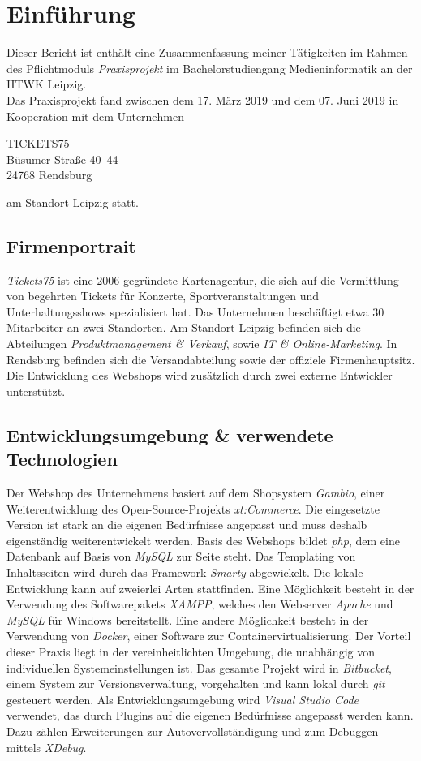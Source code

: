 \chapter{Einführung}\label{ch:einführung}
Dieser Bericht ist enthält eine Zusammenfassung meiner Tätigkeiten im Rahmen des Pflichtmoduls \textit{Praxisprojekt} im Bachelorstudiengang Medieninformatik an der HTWK Leipzig.\\
Das Praxisprojekt fand zwischen dem 17. März 2019 und dem 07. Juni 2019 in Kooperation mit dem Unternehmen
\begin{center}
	TICKETS75\\
	Büsumer Straße 40–44\\
	24768 Rendsburg
\end{center}
am Standort Leipzig statt.

\section{Firmenportrait}
\textit{Tickets75} ist eine 2006 gegründete Kartenagentur, die sich auf die Vermittlung von begehrten Tickets für Konzerte, Sportveranstaltungen und Unterhaltungsshows spezialisiert hat.
Das Unternehmen beschäftigt etwa 30 Mitarbeiter an zwei Standorten. Am Standort Leipzig befinden sich die Abteilungen \textit{Produktmanagement \& Verkauf}, sowie \textit{IT \& Online-Marketing}. 
In Rendsburg befinden sich die Versandabteilung sowie der offiziele Firmenhauptsitz. Die Entwicklung des Webshops wird zusätzlich durch zwei externe Entwickler
unterstützt.

\section{Entwicklungsumgebung \& verwendete Technologien}
Der Webshop des Unternehmens basiert auf dem Shopsystem \textit{Gambio}, einer Weiterentwicklung des Open-Source-Projekts \textit{xt:Commerce}. 
Die eingesetzte Version ist stark an die eigenen Bedürfnisse angepasst und muss deshalb eigenständig weiterentwickelt werden. Basis des Webshops bildet \textit{php}, 
dem eine Datenbank auf Basis von \textit{MySQL} zur Seite steht. Das Templating von Inhaltsseiten wird durch das Framework \textit{Smarty} abgewickelt. 
Die lokale Entwicklung kann auf zweierlei Arten stattfinden. Eine Möglichkeit besteht in der Verwendung des Softwarepakets \textit{XAMPP}, 
welches den Webserver \textit{Apache} und \textit{MySQL} für Windows bereitstellt. Eine andere Möglichkeit besteht in der Verwendung von \textit{Docker}, 
einer Software zur Containervirtualisierung. Der Vorteil dieser Praxis liegt in der vereinheitlichten Umgebung, die unabhängig von individuellen Systemeinstellungen ist. 
Das gesamte Projekt wird in \textit{Bitbucket}, einem System zur Versionsverwaltung, vorgehalten und kann lokal durch \textit{git} gesteuert werden. 
Als Entwicklungsumgebung wird \textit{Visual Studio Code} verwendet, das durch Plugins auf die eigenen Bedürfnisse angepasst werden kann. 
Dazu zählen Erweiterungen zur Autovervollständigung und zum Debuggen mittels \textit{XDebug}.


